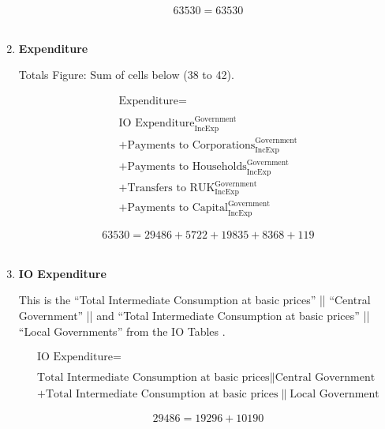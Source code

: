 \begin{enumerate}
\begin{equation} \nonumber
63530 = 63530
\end{equation}\\


\newpage


\item \textbf {Expenditure}

Totals Figure: Sum of cells below (38 to 42).

\begin{equation}
\begin{split}
\text{Expenditure} =  \\ \\
\text{IO Expenditure}^\text{Government}_\text{IncExp}\\
+\text{Payments to Corporations}^\text{Government}_\text{IncExp}\\
+\text{Payments to Households}^\text{Government}_\text{IncExp}\\
+\text{Transfers to RUK}^\text{Government}_\text{IncExp}\\
+\text{Payments to Capital}^\text{Government}_\text{IncExp}
\end{split} \label{eq:2.5.41}
\end{equation}

\begin{equation} \nonumber
63530 = 29486+5722+19835+8368+119
\end{equation}\\


\item \textbf {IO Expenditure}

This is the ``Total Intermediate Consumption at basic prices'' || ``Central Government'' ||  and ``Total Intermediate Consumption at basic prices'' || ``Local Governments'' from the IO Tables \cite{ScotGov2013a}.

\begin{equation}
\begin{split}
\text{IO Expenditure} =  \\ \\
\text{Total Intermediate Consumption at basic prices}\|\text{Central Government}\\
+\text{Total Intermediate Consumption at basic prices}\|\text{Local Government}
\end{split} \label{eq:2.5.42}
\end{equation}

\begin{equation} \nonumber
29486 = 19296+10190
\end{equation}\\


\end{enumerate}
